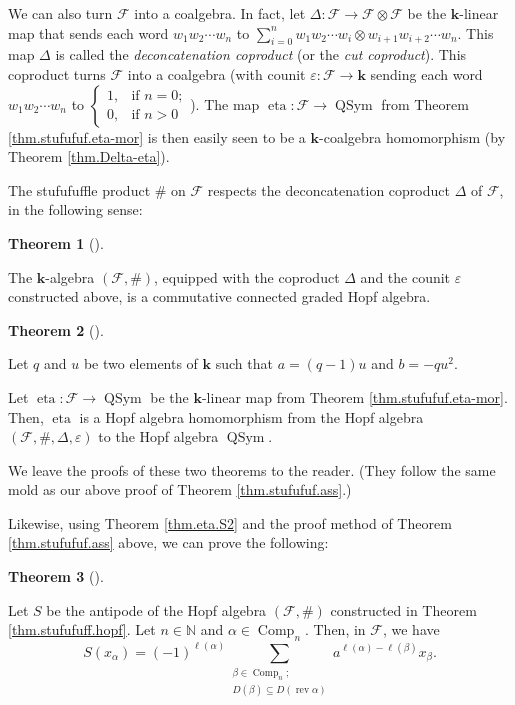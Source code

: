 \documentclass[numbers=enddot,12pt,final,onecolumn,notitlepage]{scrartcl}%
\theoremstyle{definition}
\newtheorem{theo}{Theorem}[section]
\newenvironment{theorem}[1][]
{\begin{theo}[#1]\begin{leftbar}}
{\end{leftbar}\end{theo}}
\let\sumnonlimits\sum
\renewcommand{\sum}{\sumnonlimits\limits}
\begin{document}
We can also turn $\mathcal{F}$ into a coalgebra. In fact, let $\Delta
:\mathcal{F}\rightarrow\mathcal{F}\otimes\mathcal{F}$ be the $\mathbf{k}%
$-linear map that sends each word $w_{1}w_{2}\cdots w_{n}$ to $\sum_{i=0}%
^{n}w_{1}w_{2}\cdots w_{i}\otimes w_{i+1}w_{i+2}\cdots w_{n}$. This map
$\Delta$ is called the \emph{deconcatenation coproduct} (or the \emph{cut
coproduct}). This coproduct turns $\mathcal{F}$ into a coalgebra (with counit
$\varepsilon:\mathcal{F}\rightarrow\mathbf{k}$ sending each word $w_{1}%
w_{2}\cdots w_{n}$ to $%
\begin{cases}
1, & \text{if }n=0;\\
0, & \text{if }n>0
\end{cases}
$). The map $\operatorname*{eta}:\mathcal{F}\rightarrow\operatorname*{QSym}$
from Theorem \ref{thm.stufufuf.eta-mor} is then easily seen to be a
$\mathbf{k}$-coalgebra homomorphism (by Theorem \ref{thm.Delta-eta}).

The stufufuffle product $\#$ on $\mathcal{F}$ respects the deconcatenation
coproduct $\Delta$ of $\mathcal{F}$, in the following sense:

\begin{theorem}
\label{thm.stufufuff.hopf}The $\mathbf{k}$-algebra $\left(  \mathcal{F}%
,\#\right)  $, equipped with the coproduct $\Delta$ and the counit
$\varepsilon$ constructed above, is a commutative connected graded Hopf algebra.
\end{theorem}

\begin{theorem}
\label{thm.stufufuf.eta-hmor}Let $q$ and $u$ be two elements of $\mathbf{k}$
such that $a=\left(  q-1\right)  u$ and $b=-qu^{2}$.

Let $\operatorname*{eta}:\mathcal{F}\rightarrow\operatorname*{QSym}$ be the
$\mathbf{k}$-linear map from Theorem \ref{thm.stufufuf.eta-mor}. Then,
$\operatorname*{eta}$ is a Hopf algebra homomorphism from the Hopf algebra
$\left(  \mathcal{F},\#,\Delta,\varepsilon\right)  $ to the Hopf algebra
$\operatorname*{QSym}$.
\end{theorem}

We leave the proofs of these two theorems to the reader. (They follow the same
mold as our above proof of Theorem \ref{thm.stufufuf.ass}.)

Likewise, using Theorem \ref{thm.eta.S2} and the proof method of Theorem
\ref{thm.stufufuf.ass} above, we can prove the following:

\begin{theorem}
\label{thm.stufufuff.antipode}Let $S$ be the antipode of the Hopf algebra
$\left(  \mathcal{F},\#\right)  $ constructed in Theorem
\ref{thm.stufufuff.hopf}. Let $n\in\mathbb{N}$ and $\alpha\in
\operatorname*{Comp}\nolimits_{n}$. Then, in $\mathcal{F}$, we have%
\[
S\left(  x_{\alpha}\right)  =\left(  -1\right)  ^{\ell\left(  \alpha\right)
}\sum_{\substack{\beta\in\operatorname*{Comp}\nolimits_{n};\\D\left(
\beta\right)  \subseteq D\left(  \operatorname*{rev}\alpha\right)  }%
}a^{\ell\left(  \alpha\right)  -\ell\left(  \beta\right)  }x_{\beta}.
\]

\end{theorem}
\end{document}
